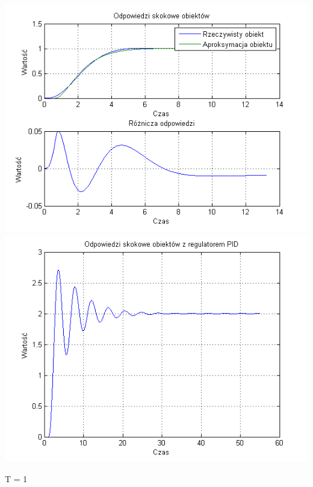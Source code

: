 \documentclass[10pt,a4paper]{article}
\begin{document}
\begin{center}
\includegraphics[scale=1]{images/dwa/skrypt_263.png}\\
\includegraphics[scale=1]{images/dwa/skrypt_264.png}\\
\end{center}
\newpage
T = 1
\end{document}
